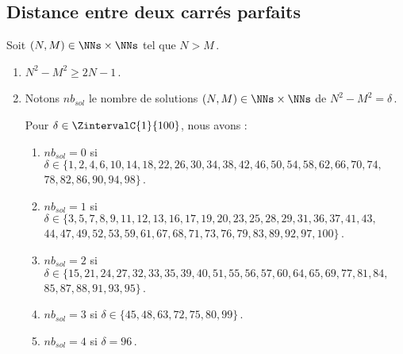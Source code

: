 

\subsection{Distance entre deux carrés parfaits}

\begin{fact} \label{diff-square-ko}
	Soit $(N, M) \in \NNs \times \NNs$ tel que $N > M$\,.
	\begin{enumerate}
		\item $N^2 - M^2 \geq 2N - 1$\,.
		
		\newpage
		\item Notons $nb_{sol}$ le nombre de solutions $(N, M) \in \NNs \times \NNs$ de $N^2 - M^2 = \delta$\,.
		
		\smallskip
		\noindent
		Pour $\delta \in \ZintervalC{1}{100}$, nous avons :
		\begin{enumerate}
			\item $nb_{sol}= 0$ si $\delta \in \{ 1, 2, 4, 6, 10, 14, 18, 22, 26, 30, 34, 38, 42, 46, 50, 54, 58, 62, 66, 70, 74,$ $78, 82, 86, 90, 94, 98 \}$\,.

			\item $nb_{sol}= 1$ si $\delta \in \{ 3, 5, 7, 8, 9, 11, 12, 13, 16, 17, 19, 20, 23, 25, 28, 29, 31, 36, 37, 41, 43,$ $44, 47, 49, 52, 53, 59, 61, 67, 68, 71, 73, 76, 79, 83, 89, 92, 97, 100 \}$\,.

			\item $nb_{sol}= 2$ si $\delta \in \{ 15, 21, 24, 27, 32, 33, 35, 39, 40, 51, 55, 56, 57, 60, 64, 65, 69, 77, 81, 84,$ $85, 87, 88, 91, 93, 95 \}$\,.

			\item $nb_{sol}= 3$ si $\delta \in \{ 45, 48, 63, 72, 75, 80, 99 \}$\,.

			\item $nb_{sol}= 4$ si $\delta = 96$\,.
		\end{enumerate}
	\end{enumerate}
\end{fact}


